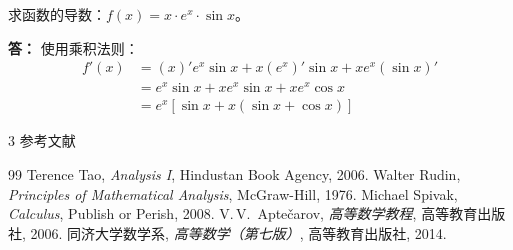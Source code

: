 \documentclass{harryopo-mathnotes}
\begin{document}
\begin{exercise}[附录习题]
  求函数的导数：$f(x)=x\cdot e^x\cdot\sin x$。
\end{exercise}

\begin{answer}
  \textbf{答：}
  {\fzkt 使用乘积法则：
  \begin{align*}
    f'(x) &= (x)'e^x\sin x + x(e^x)'\sin x + xe^x(\sin x)' \\
          &= e^x\sin x + xe^x\sin x + xe^x\cos x \\
          &= e^x[\sin x + x(\sin x + \cos x)]
  \end{align*}}
\end{answer}

\cleardoublepage
{
  \thispagestyle{empty}
  \begin{spacing}{3}
    {\noindent\TitleFontc\fzdbs 参考文献}
  \end{spacing}
}

\begin{thebibliography}{99}
   Terence Tao, \textit{Analysis I}, Hindustan Book Agency, 2006.
   Walter Rudin, \textit{Principles of Mathematical Analysis}, McGraw-Hill, 1976.
   Michael Spivak, \textit{Calculus}, Publish or Perish, 2008.
   V.\,V.\ Apte\v{c}arov, \textit{高等数学教程}, 高等教育出版社, 2006.
   同济大学数学系, \textit{高等数学（第七版）}, 高等教育出版社, 2014.
\end{thebibliography}
\end{document}
